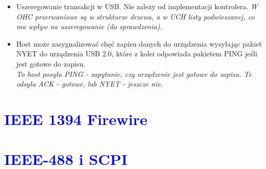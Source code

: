 \documentclass[a4paper,twoside]{article}
\begin{document}
\begin{itemize}
	\item \textcolor{nie}{Uszeregowanie transakcji w USB. Nie zależy od implementacji kontrolera.}
	{\small \emph{W OHC przerwaniowe są w strukturze drzewa, a w UCH listy podwieszanej, co ma wpływ na uszeregowanie (do sprawdzenia).}}
	
	\item \textcolor{nie}{Host może zasygnalizować chęć zapisu danych do urządzenia wysyłając pakiet NYET do urządzenia USB 2.0, które z kolei odpowiada pakietem PING jeśli jest gotowe do zapisu.} \\
	{\small \emph{To host posyła PING - zapytanie, czy urządzenie jest gotowe do zapisu. Te odsyła ACK - gotowe, lub NYET - jeszcze nie.}}
	
\end{itemize}

\section{\textcolor{blue}{IEEE 1394 Firewire}}

\section{\textcolor{blue}{IEEE-488 i SCPI}}
\end{document}

